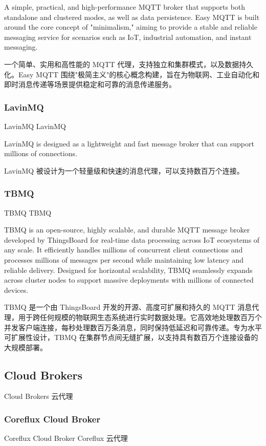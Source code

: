 \documentclass{ctexbook}
\begin{document}
A simple, practical, and high-performance MQTT broker that supports both standalone and clustered modes, as well as data persistence. Easy MQTT is built around the core concept of "minimalism," aiming to provide a stable and reliable messaging service for scenarios such as IoT, industrial automation, and instant messaging.

一个简单、实用和高性能的 MQTT 代理，支持独立和集群模式，以及数据持久化。Easy MQTT 围绕"极简主义"的核心概念构建，旨在为物联网、工业自动化和即时消息传递等场景提供稳定和可靠的消息传递服务。

\subsubsection{LavinMQ}
LavinMQ LavinMQ

LavinMQ is designed as a lightweight and fast message broker that can support millions of connections.

LavinMQ 被设计为一个轻量级和快速的消息代理，可以支持数百万个连接。

\subsubsection{TBMQ}
TBMQ TBMQ

TBMQ is an open-source, highly scalable, and durable MQTT message broker developed by ThingsBoard for real-time data processing across IoT ecosystems of any scale. It efficiently handles millions of concurrent client connections and processes millions of messages per second while maintaining low latency and reliable delivery. Designed for horizontal scalability, TBMQ seamlessly expands across cluster nodes to support massive deployments with millions of connected devices.

TBMQ 是一个由 ThingsBoard 开发的开源、高度可扩展和持久的 MQTT 消息代理，用于跨任何规模的物联网生态系统进行实时数据处理。它高效地处理数百万个并发客户端连接，每秒处理数百万条消息，同时保持低延迟和可靠传递。专为水平可扩展性设计，TBMQ 在集群节点间无缝扩展，以支持具有数百万个连接设备的大规模部署。

\subsection{Cloud Brokers}
Cloud Brokers 云代理

\subsubsection{Coreflux Cloud Broker}
Coreflux Cloud Broker Coreflux 云代理
\end{document}
